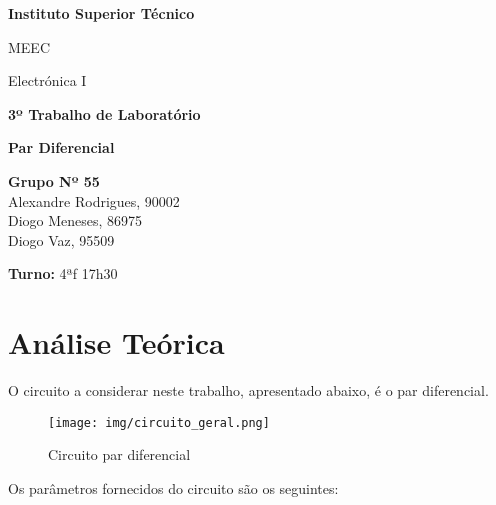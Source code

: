 \documentclass[a4paper,2pt]{report}
\begin{document}
\begin{titlepage}
    \begin{center}
        \vspace*{3cm}
 
        \LARGE
        \textbf{Instituto Superior Técnico}
        \vskip 0.4cm
 
        \Large{MEEC}
        \vskip 0.2cm

        \Large{Electrónica I}
        \vskip 3cm
        

 
        \Huge{\textbf{3º Trabalho de Laboratório}}
        \vskip 0.5cm

        \huge{\textbf{Par Diferencial}}
        \vskip 0.5cm

 
        \vfill
 
        \large
        \textbf{Grupo Nº 55}\\
        \vspace{0.3cm}
        Alexandre Rodrigues, 90002\\
        Diogo Meneses, 86975\\
        Diogo Vaz, 95509\\
        \vspace{1cm}

        \textbf{Turno:} 4ªf 17h30

    \end{center}
\end{titlepage}

\tableofcontents

\chapter{Análise Teórica}
\addtocounter{chapter}{2}

\par O circuito a considerar neste trabalho, apresentado abaixo, é o par diferencial.

\begin{figure}[H]
    \centering
    \texttt{[image: img/circuito\_geral.png]}
    \caption{Circuito par diferencial}
    \label{}
\end{figure}

\par Os parâmetros fornecidos do circuito são os seguintes:

\begin{table}[H]
    \centering
\end{table}
\end{document}
